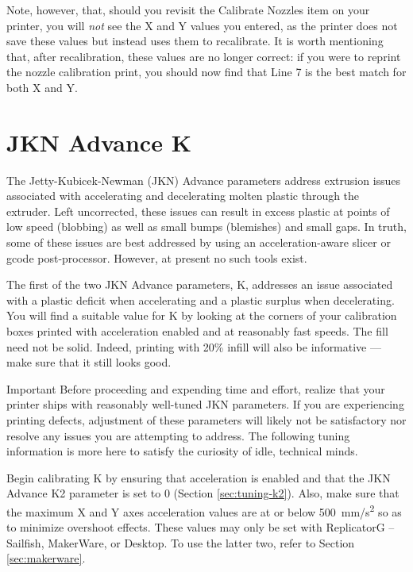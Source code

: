Note, however, that, should you revisit the Calibrate Nozzles item on your printer, you will \emph{not} see the X and Y values you entered, as the printer does not save these values but instead uses them to recalibrate.  It is worth mentioning that, after recalibration, these values are no longer correct: if you were to reprint the nozzle calibration print, you should now find that Line 7 is the best match for both X and Y.


\section{JKN Advance K} \label{sec:tuning-k}

The Jetty-Kubicek-Newman (JKN) Advance parameters address extrusion
issues associated with accelerating and decelerating molten plastic
through the extruder. Left uncorrected, these issues can
result in excess plastic at points of low speed (blobbing) as well as
small bumps (blemishes) and small gaps. In truth, some of these issues
are best addressed by using an ac\-cel\-er\-a\-tion-aware slicer or gcode post-processor. However, at present no such tools exist.

The first of the two JKN Advance parameters, K, addresses an issue
associated with a plastic deficit when accelerating and a plastic
surplus when decelerating. You will find a suitable value for K by
looking at the corners of your calibration boxes printed with
acceleration enabled and at reasonably fast speeds. The fill need
not be solid. Indeed, printing with 20\% infill will also be
informative --- make sure that it still looks good.

\begin{bclogo}[logo=\bcinfo, noborder=true, couleurBarre=yellow]{Important}
Before proceeding and expending time and effort, realize that your printer
ships with reasonably well-tuned JKN parameters.  If you are experiencing
printing defects, adjustment of these parameters will likely not be
satisfactory nor resolve any issues you are attempting to address.  The
following tuning information is more here to satisfy the curiosity of idle, technical minds.
\end{bclogo}

Begin calibrating K by ensuring that acceleration is enabled and
that the JKN Advance K2 parameter is set to 0 (Section \ref{sec:tuning-k2}).
Also, make sure that the maximum X and Y axes acceleration values
are at or below 500~mm/s\textsuperscript{2} so as to minimize overshoot effects.  These values may only be set with ReplicatorG -- Sailfish, MakerWare, or Desktop.  To use the latter two, refer to Section \ref{sec:makerware}.

